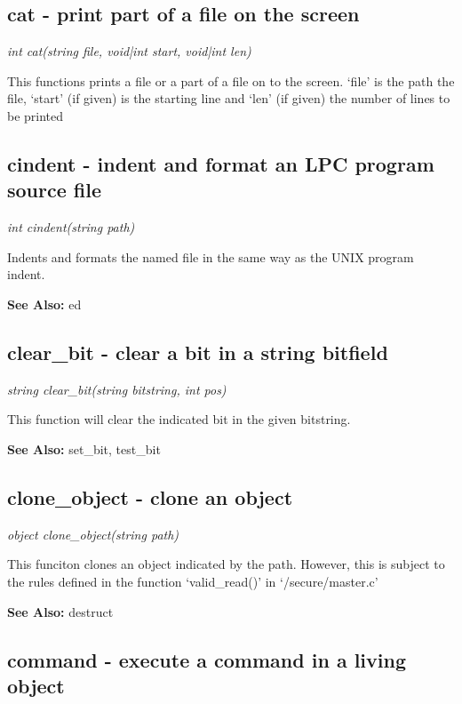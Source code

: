 \subsection{cat - print part of a file on the screen}
    
    {\em int cat(string file, void|int start, void|int len)}

    This functions prints a file or a part of a file on to the
    screen. `file' is the path the file, `start' (if given) is
    the starting line and `len' (if given) the number of lines 
    to be printed



\subsection{cindent - indent and format an LPC program source file}

    {\em int cindent(string path)}

    Indents and formats the named file in the same way as the
    UNIX program indent.

    {\bf See Also: }    ed


\subsection{clear\_bit - clear a bit in a string bitfield}

    {\em string clear\_bit(string bitstring, int pos)}

    This function will clear the indicated bit in the given bitstring.

    {\bf See Also: }    set\_bit, test\_bit


\subsection{clone\_object - clone an object}

    {\em object clone\_object(string path)}

    This funciton clones an object indicated by the path. However,
    this is subject to the rules defined in the function `valid\_read()'
    in `/secure/master.c'

    {\bf See Also: }    destruct


\subsection{command - execute a command in a living object}

